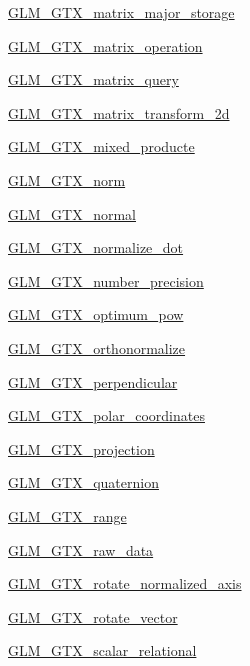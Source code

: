 \begin{DoxyCompactItemize}
\item 
\hyperlink{group__gtx__matrix__major__storage}{G\+L\+M\+\_\+\+G\+T\+X\+\_\+matrix\+\_\+major\+\_\+storage}
\item 
\hyperlink{group__gtx__matrix__operation}{G\+L\+M\+\_\+\+G\+T\+X\+\_\+matrix\+\_\+operation}
\item 
\hyperlink{group__gtx__matrix__query}{G\+L\+M\+\_\+\+G\+T\+X\+\_\+matrix\+\_\+query}
\item 
\hyperlink{group__gtx__matrix__transform__2d}{G\+L\+M\+\_\+\+G\+T\+X\+\_\+matrix\+\_\+transform\+\_\+2d}
\item 
\hyperlink{group__gtx__mixed__product}{G\+L\+M\+\_\+\+G\+T\+X\+\_\+mixed\+\_\+producte}
\item 
\hyperlink{group__gtx__norm}{G\+L\+M\+\_\+\+G\+T\+X\+\_\+norm}
\item 
\hyperlink{group__gtx__normal}{G\+L\+M\+\_\+\+G\+T\+X\+\_\+normal}
\item 
\hyperlink{group__gtx__normalize__dot}{G\+L\+M\+\_\+\+G\+T\+X\+\_\+normalize\+\_\+dot}
\item 
\hyperlink{group__gtx__number__precision}{G\+L\+M\+\_\+\+G\+T\+X\+\_\+number\+\_\+precision}
\item 
\hyperlink{group__gtx__optimum__pow}{G\+L\+M\+\_\+\+G\+T\+X\+\_\+optimum\+\_\+pow}
\item 
\hyperlink{group__gtx__orthonormalize}{G\+L\+M\+\_\+\+G\+T\+X\+\_\+orthonormalize}
\item 
\hyperlink{group__gtx__perpendicular}{G\+L\+M\+\_\+\+G\+T\+X\+\_\+perpendicular}
\item 
\hyperlink{group__gtx__polar__coordinates}{G\+L\+M\+\_\+\+G\+T\+X\+\_\+polar\+\_\+coordinates}
\item 
\hyperlink{group__gtx__projection}{G\+L\+M\+\_\+\+G\+T\+X\+\_\+projection}
\item 
\hyperlink{group__gtx__quaternion}{G\+L\+M\+\_\+\+G\+T\+X\+\_\+quaternion}
\item 
\hyperlink{group__gtx__range}{G\+L\+M\+\_\+\+G\+T\+X\+\_\+range}
\item 
\hyperlink{group__gtx__raw__data}{G\+L\+M\+\_\+\+G\+T\+X\+\_\+raw\+\_\+data}
\item 
\hyperlink{group__gtx__rotate__normalized__axis}{G\+L\+M\+\_\+\+G\+T\+X\+\_\+rotate\+\_\+normalized\+\_\+axis}
\item 
\hyperlink{group__gtx__rotate__vector}{G\+L\+M\+\_\+\+G\+T\+X\+\_\+rotate\+\_\+vector}
\item 
\hyperlink{group__gtx__scalar__relational}{G\+L\+M\+\_\+\+G\+T\+X\+\_\+scalar\+\_\+relational}

\end{DoxyCompactItemize}

